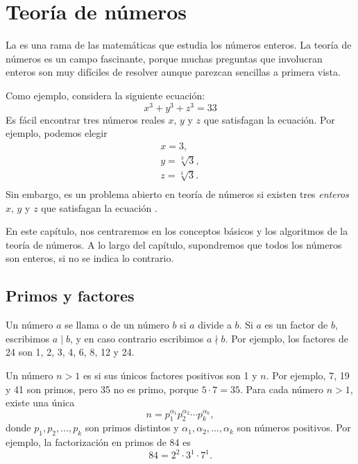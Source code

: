 \chapter{Teoría de números}


La  es una rama de las matemáticas
que estudia los números enteros.
La teoría de números es un campo fascinante,
porque muchas preguntas que involucran enteros
son muy difíciles de resolver aunque
parezcan sencillas a primera vista.

Como ejemplo, considera la siguiente ecuación:
\[x^3 + y^3 + z^3 = 33\]
Es fácil encontrar tres números reales $x$, $y$ y $z$
que satisfagan la ecuación.
Por ejemplo, podemos elegir
\[
\begin{array}{lcl}
x = 3, \\
y = \sqrt[3]{3}, \\
z = \sqrt[3]{3}.\\
\end{array}
\]
Sin embargo, es un problema abierto en teoría de números
si existen tres
\emph{enteros} $x$, $y$ y $z$
que satisfagan la ecuación \cite{bec07}.

En este capítulo, nos centraremos en los conceptos básicos
y los algoritmos de la teoría de números.
A lo largo del capítulo, supondremos que todos los números
son enteros, si no se indica lo contrario.

\section{Primos y factores}


Un número $a$ se llama  o  de un número $b$
si $a$ divide a $b$.
Si $a$ es un factor de $b$,
escribimos $a \mid b$, y en caso contrario escribimos $a \nmid b$.
Por ejemplo, los factores de 24 son
1, 2, 3, 4, 6, 8, 12 y 24.


Un número $n>1$ es 
si sus únicos factores positivos son 1 y $n$.
Por ejemplo, 7, 19 y 41 son primos,
pero 35 no es primo, porque $5 \cdot 7 = 35$.
Para cada número $n>1$, existe una única
\[ n = p_1^{\alpha_1} p_2^{\alpha_2} \cdots p_k^{\alpha_k},\]
donde $p_1,p_2,\ldots,p_k$ son primos distintos y
$\alpha_1,\alpha_2,\ldots,\alpha_k$ son números positivos.
Por ejemplo, la factorización en primos de 84 es
\[84 = 2^2 \cdot 3^1 \cdot 7^1.\]

